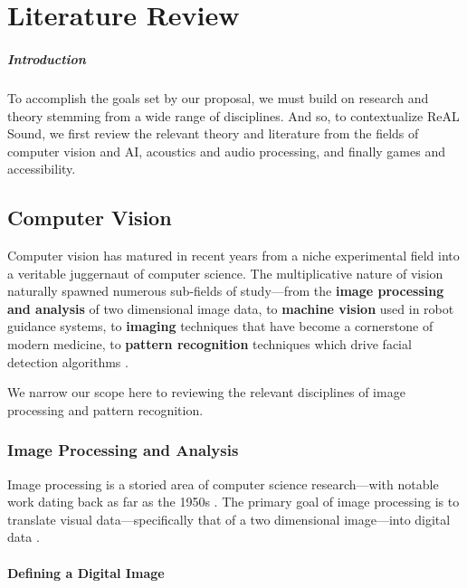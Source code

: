 \documentclass{report}
\newcommand{\rs}{ReAL Sound\xspace}
\newcommand{\tech}[1]{\textbf{#1}}
\begin{document}

\chapter{Literature Review} 

\paragraph{Introduction}

To accomplish the goals set by our proposal, we must build on research and theory stemming from a wide range of disciplines. And so, to contextualize \rs, we first review the relevant theory and literature from the fields of computer vision and AI, acoustics and audio processing, and finally games and accessibility.

\section{Computer Vision}

Computer vision has matured in recent years from a niche experimental field into a veritable juggernaut of computer science. The multiplicative nature of vision naturally spawned numerous sub-fields of study---from the \tech{image processing and analysis} of two dimensional image data, to \tech{machine vision} used in robot guidance systems, to \tech{imaging} techniques that have become a cornerstone of modern medicine, to \tech{pattern recognition} techniques which drive facial detection algorithms \cite{dobson2023birth}. 

We narrow our scope here to reviewing the relevant disciplines of image processing and pattern recognition. 

\subsection{Image Processing and Analysis}
Image processing is a storied area of computer science research---with notable work dating back as far as the 1950s \cite{imageprocessing}. The primary goal of image processing is to translate visual data---specifically that of a two dimensional image---into digital data \cite{marion2013introduction}. 

\subsubsection{Defining a Digital Image}
\end{document}
